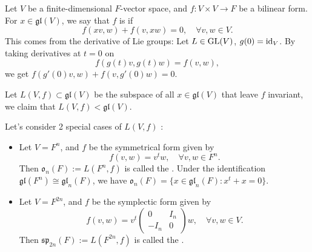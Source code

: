 \begin{example}
    Let $V$ be a finite-dimensional $F$-vector space, and $f: V\times V\to F$ be
	a bilinear form. For $x\in \mathfrak{gl}(V)$, we say that $f$ is
	 if
	\[
	f(xv, w) + f(v, xw) = 0, \quad \forall v, w\in V.
	\]
	This comes from the derivative of Lie groups:
	Let $L\in \mathrm{GL}(V)$, $g(0) = \operatorname{id}_V$. By taking derivatives at $t=0$ on
	\[
	f(g(t)v, g(t)w) = f(v, w),
	\]
	we get $f(g'(0)v, w) + f(v, g'(0)w) = 0$.

	Let $L(V, f) \subset \mathfrak{gl}(V)$ be the subspace of
	all $x\in \mathfrak{gl}(V)$ that leave $f$ invariant,
	we claim that $L(V, f) < \mathfrak{gl}(V)$.
\end{example}

\begin{example}
    Let's consider 2 special cases of $L(V, f)$ :
	\begin{itemize}
		\item Let $V = F^n$, and $f$ be the symmetrical form given by
			\[
			f(v, w) = v^tw, \quad \forall v, w\in F^n.
			\]
			Then $\mathfrak{o}_n(F):= L(F^n, f)$ is called the
			.
			Under the identification $\mathfrak{gl}(F^n) \cong \mathfrak{gl}_n(F)$,
			we have $\mathfrak{o}_n(F) = \{x\in \mathfrak{gl}_n(F): x^t+x=0\}$.
		\item Let $V = F^{2n}$, and $f$ be the symplectic form given by
			\[
			f(v, w) = v^t \begin{pmatrix}
				0 & I_n\\ -I_n & 0
			\end{pmatrix}
			w, \quad \forall v, w\in V.
			\]
			Then $\mathfrak{sp}_{2n}(F) := L(F^{2n}, f)$ is called the
			.
	\end{itemize}
\end{example}

